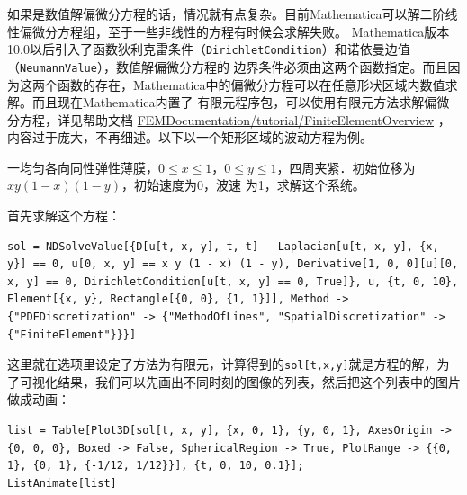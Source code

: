 \documentclass[UTF8,a4paper,10pt]{ctexart}
\begin{document}
如果是数值解偏微分方程的话，情况就有点复杂。目前Mathematica可以解二阶线性偏微分方程组，至于一些非线性的方程有时候会求解失败。
Mathematica版本10.0以后引入了函数狄利克雷条件（\verb|DirichletCondition|）和诺依曼边值（\verb|NeumannValue|），数值解偏微分方程的
边界条件必须由这两个函数指定。而且因为这两个函数的存在，Mathematica中的偏微分方程可以在任意形状区域内数值求解。而且现在Mathematica内置了
有限元程序包，可以使用有限元方法求解偏微分方程，详见帮助文档
\href{http://reference.wolfram.com/language/FEMDocumentation/tutorial/FiniteElementOverview.html}{FEMDocumentation/tutorial/FiniteElementOverview}
，内容过于庞大，不再细述。以下以一个矩形区域的波动方程为例。

一均匀各向同性弹性薄膜，$0\leq x \leq1$，$0\leq y \leq1$，四周夹紧．初始位移为 $xy(1-x)(1-y)$，初始速度为0，波速
为1，求解这个系统。

首先求解这个方程：

\begin{lstlisting}
sol = NDSolveValue[{D[u[t, x, y], t, t] - Laplacian[u[t, x, y], {x, y}] == 0, u[0, x, y] == x y (1 - x) (1 - y), Derivative[1, 0, 0][u][0, x, y] == 0, DirichletCondition[u[t, x, y] == 0, True]}, u, {t, 0, 10}, Element[{x, y}, Rectangle[{0, 0}, {1, 1}]], Method -> {"PDEDiscretization" -> {"MethodOfLines", "SpatialDiscretization" -> {"FiniteElement"}}}]
\end{lstlisting}
这里就在选项里设定了方法为有限元，计算得到的\verb|sol[t,x,y]|就是方程的解，为了可视化结果，我们可以先画出不同时刻的图像的列表，然后把这个列表中的图片做成动画：

\begin{lstlisting}
list = Table[Plot3D[sol[t, x, y], {x, 0, 1}, {y, 0, 1}, AxesOrigin ->{0, 0, 0}, Boxed -> False, SphericalRegion -> True, PlotRange -> {{0, 1}, {0, 1}, {-1/12, 1/12}}], {t, 0, 10, 0.1}];
ListAnimate[list]

\end{lstlisting}
\end{document}
